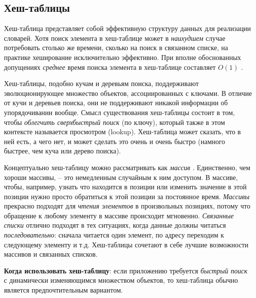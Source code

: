 \documentclass[%
	11pt,
	a4paper,
	utf8,
		]{article}
\begin{document}
\subsection{Хеш-таблицы}

Хеш-таблица представляет собой эффективную структуру данных для реализации словарей. Хотя поиск элемента в хеш-таблице может в \emph{наихудшем} случае потребовать столько же времени, сколько на поиск в связанном списке, на практике хеширование исключительно эффективно. При вполне обоснованных допущениях \emph{среднее} время поиска элемента в хеш-таблице составляет $ O(1) $ \cite[285]{cormen-algo:2013}.

Хеш-таблицы, подобно кучам и деревьям поиска, поддерживают эволюционирующее множество объектов, ассоциированных с ключами. В отличие от кучи и деревьев поиска, они не поддерживают никакой информации об упорядочивании вообще. Смысл существования хеш-таблицы состоит в том, чтобы \emph{облегчить сверхбыстрый поиск} (по ключу), который также в этом контексте называется просмотром (lookup). Хеш-таблица может сказать, что в ней есть, а чего нет, и может сделать это очень и очень быстро (намного быстрее, чем куча или дерево поиска).

Концептуально хеш-таблицу можно рассматривать как \emph{массив} \cite{roughgarden-graph:2019}. Единственно, чем хороши массивы, -- это немедленным случайным к ним доступом. В массиве, чтобы, например, узнать что находится в позиции или изменить значение в этой позиции нужно просто обратиться к этой позиции за постоянное время. \emph{Массивы} прекрасно подходят для \emph{чтения элементов} в произвольных позициях, потому что обращение к любому элементу в массиве происходит мгновенно. \emph{Связанные списки} отлично подходят в тех ситуациях, когда данные должны читаться \emph{последовательно}: сначала читается один элемент, по адресу переходим к следующему элементу и т.д. Хеш-таблицы сочетают в себе лучшие возможности массивов и связанных списков.

\textbf{Когда использовать хеш-таблицу}: если приложению требуется \emph{быстрый поиск} с динамически изменяющимся множеством объектов, то хеш-таблица обычно является предпочтительным вариантом.
\end{document}
